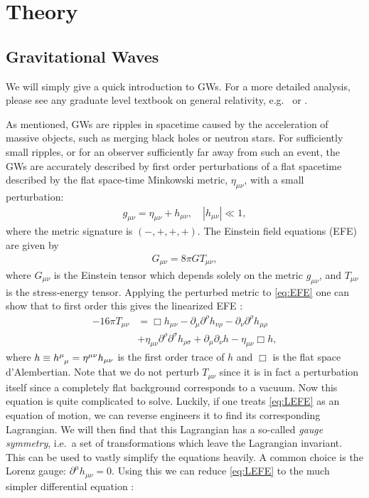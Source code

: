 \documentclass[%
reprint,
amsmath,amssymb,
aps,
]{revtex4-2}
\newcommand{\p}{\partial}
\begin{document}
\section{Theory}
\label{sec:theory}
\subsection{Gravitational Waves}
We will simply give a quick introduction to GWs. For a more detailed analysis, please see any graduate level textbook on general relativity, e.g.~\cite{Carroll} or \cite{Wald}.

As mentioned, GWs are ripples in spacetime caused by the acceleration of massive objects, such as merging black holes or neutron stars. For sufficiently small ripples, or for an observer sufficiently far away from such an event, the GWs are accurately described by first order perturbations of a flat spacetime described by the flat space-time Minkowski metric, $\eta_{\mu\nu}$, with a small perturbation:
\begin{align}
	g_{\mu\nu}=\eta_{\mu\nu}+h_{\mu\nu},\quad|h_{\mu\nu}|\ll1,
\end{align}
where the metric signature is $(-,+,+,+)$. The Einstein field equations (EFE) are given by
\begin{align}
	G_{\mu\nu}=8\pi GT_{\mu\nu},
	\label{eq:EFE}
\end{align}
where $G_{\mu\nu}$ is the Einstein tensor which depends solely on the metric $g_{\mu\nu}$, and $T_{\mu\nu}$ is the stress-energy tensor. Applying the perturbed metric to \eqref{eq:EFE} one can show that to first order this gives the linearized EFE \cite{Carroll}:
\begin{align}
	-16\pi T_{\mu\nu}&=\Box h_{\mu\nu}-\p_\mu\p^\rho h_{\nu\rho}-\p_\nu\p^\rho h_{\mu\rho}\nonumber\\
	&+\eta_{\mu\nu}\p^\rho\p^\sigma h_{\rho\sigma}+\p_\mu \p_\nu h-\eta_{\mu\nu}\Box h,
	\label{eq:LEFE}
\end{align}
where $h\equiv \tensor{h}{^\mu_\mu}=\eta^{\mu\nu}h_{\mu\nu}$ is the first order trace of $h$ and $\Box$ is the flat space d'Alembertian. Note that we do not perturb $T_{\mu\nu}$ since it is in fact a perturbation itself since a completely flat background corresponds to a vacuum. Now this equation is quite complicated to solve. Luckily, if one treats \eqref{eq:LEFE} as an equation of motion, we can reverse engineers it to find its corresponding Lagrangian. We will then find that this Lagrangian has a so-called \textit{gauge symmetry}, i.e.~a set of transformations which leave the Lagrangian invariant. This can be used to vastly simplify the equations heavily. A common choice is the Lorenz gauge: $\p^\mu h_{\mu\nu}=0$. Using this we can reduce \eqref{eq:LEFE} to the much simpler differential equation \cite{Carroll}:
\end{document}
